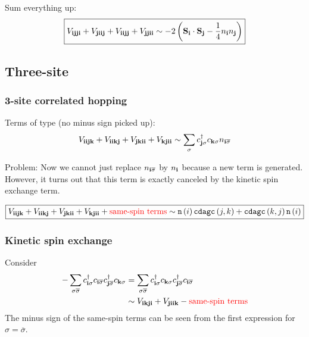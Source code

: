 \documentclass[12pt,paper=a4,BCOR=16mm]{article}
\newcommand{\cs}[1]{c_{#1\sigma}}
\newcommand{\cdags}[1]{c^{\dagger}_{#1\sigma}}
\newcommand{\cS}[1]{c_{#1\overline{\sigma}}}
\newcommand{\cdagS}[1]{c^{\dagger}_{#1\overline{\sigma}}}
\begin{document}
Sum everything up:
\begin{equation}
\boxed{ V_{\mathbf{ijji}} + V_{\mathbf{jiij}} + V_{\mathbf{iijj}} + V_{\mathbf{jjii}} 
\sim -2\left( \mathbf{S}_{\mathbf{i}}\cdot \mathbf{S}_{\mathbf{j}} - \frac{1}{4} n_{\mathbf{i}}n_{\mathbf{j}} \right)
}
\end{equation}

\subsection{Three-site}

\subsubsection{3-site correlated hopping}

Terms of type (no minus sign picked up):
\begin{equation}
V_{\v{iijk}} + V_{\v{iikj}} + V_{\v{jkii}} + V_{\v{kjii}} \sim \sum_{\sigma} \cdags{\v{j}}\cs{\v{k}} n_{\v{i}\overline{\sigma}}
\end{equation}

Problem: Now we cannot just replace $n_{\mathbf{i}\overline{\sigma}}$ by $n_{\mathbf{i}}$ because a new term is generated. However, it turns out that this term is exactly canceled by the kinetic spin exchange term.

\begin{equation}
\boxed{ V_{\mathbf{iijk}} + V_{\mathbf{iikj}} + V_{\mathbf{jkii}} + V_{\mathbf{kjii}} + {\color{red}\text{same-spin terms}} \sim \mathtt{n}\left(i\right) \mathtt{cdagc}\left(j,k\right) + \mathtt{cdagc}\left(k,j\right) \mathtt{n}\left(i\right)
}
\end{equation}

\subsubsection{Kinetic spin exchange}

Consider
\begin{equation}
\begin{split}
-\sum_{\sigma\overline{\sigma}} \cdags{\v{i}} \cS{\v{i}} \cdagS{\v{j}} \cs{\v{k}} 
&= \sum_{\sigma\overline{\sigma}} \cdags{\v{i}} \cs{\v{k}} \cdagS{\v{j}} \cS{\v{i}} \\
&\sim V_{\v{ikji}} + V_{\v{jiik}} - {\color{red}\text{same-spin terms}}
\end{split}
\end{equation}
The minus sign of the same-spin terms can be seen from the first expression for $\sigma=\overline{\sigma}$.
\end{document}
